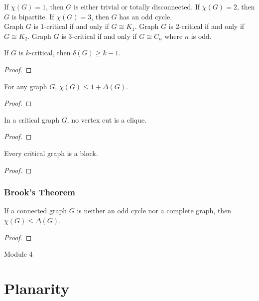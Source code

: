 \begin{remark}
	If $\chi(G) = 1$, then $G$ is either trivial or totally disconnected. If $\chi(G) = 2$, then $G$ is bipartite. If $\chi(G) = 3$, then $G$ has an odd cycle.\\

	Graph $G$ is $1$-critical if and only if $G \cong K_1$. Graph $G$ is $2$-critical if and only if $G \cong K_2$. Graph $G$ is $3$-critical if and only if $G \cong C_n$ where $n$ is odd.
\end{remark}

\begin{theorem}
	If $G$ is $k$-critical, then $\delta(G) \ge k-1$.
\end{theorem}
\begin{proof}
\end{proof}

\begin{corollary}
	For any graph $G$, $\chi(G) \le 1 + \Delta(G)$.
\end{corollary}
\begin{proof}
\end{proof}

\begin{theorem}
	In a critical graph $G$, no vertex cut is a clique.
\end{theorem}
\begin{proof}
\end{proof}

\begin{corollary}
	Every critical graph is a block.
\end{corollary}
\begin{proof}
\end{proof}

\subsubsection{Brook's Theorem}
\begin{theorem}
	If a connected graph $G$ is neither an odd cycle nor a complete graph, then $\chi(G) \le \Delta(G)$.
\end{theorem}
\begin{proof}
\end{proof}
\pagebreak

{\Large Module 4}
\section{Planarity}
\setcounter{subsection}{1}

